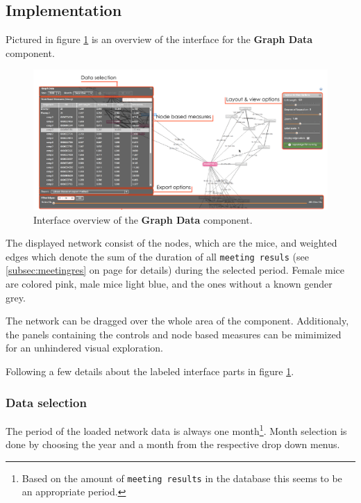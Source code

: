 \subsection{Implementation}
\label{subsec:graph_explore}

Pictured in figure \ref{fig:graph_data_interface_overview} is an overview of the interface for the \textbf{Graph Data} component. 

\begin{figure}[!htpb]
\begin{center}
  \includegraphics[width=\textwidth]{assets/pdf/graph_data_interface_overview.pdf}
  \caption[Graph Data interface overview]{Interface overview of the \textbf{Graph Data} component.}
  \label{fig:graph_data_interface_overview}
\end{center}
\end{figure}

The displayed network consist of the nodes, which are the mice, and weighted edges which denote the sum of the duration of all \lstinline|meeting resuls| (see \ref{subsec:meetingres} on page \pageref{subsec:meetingres} for details) during the selected period. Female mice are colored pink, male mice light blue, and the ones without a known gender grey. 

The network can be dragged over the whole area of the component. Additionaly, the panels containing the controls and node based measures can be mimimized for an unhindered visual exploration.

Following a few details about the labeled interface parts in figure \ref{fig:graph_data_interface_overview}.

\subsubsection*{Data selection} 
The period of the loaded network data is always one month\footnote{Based on the amount of \lstinline|meeting results| in the database this seems to be an appropriate period.}. Month selection is done by choosing the year and a month from the respective drop down menus.  

